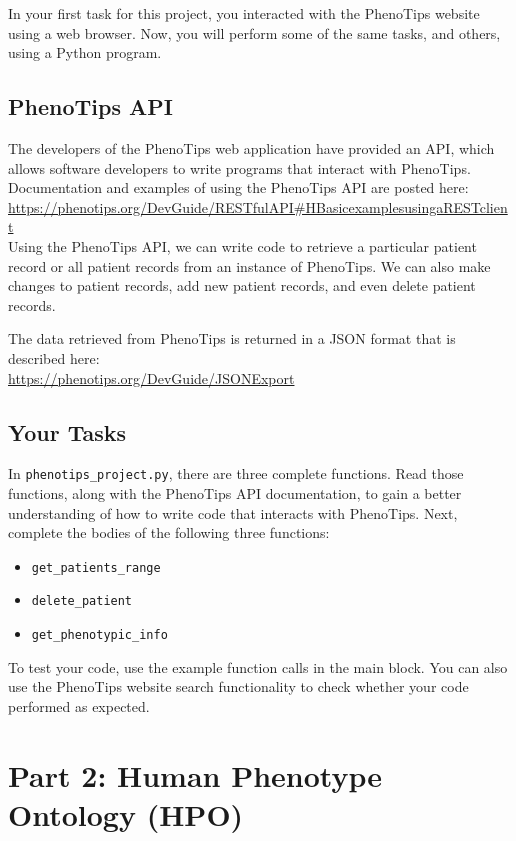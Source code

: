 \documentclass[a4paper]{article}
\begin{document}
In your first task for this project, you interacted with the PhenoTips website using a web browser.  Now, you will perform some of the same tasks, and others, using a Python program.

\subsection{PhenoTips API}

The developers of the PhenoTips web application have provided an API, which allows software developers to write programs that interact with PhenoTips.  Documentation and examples of using the PhenoTips API are posted here:\\

\url{https://phenotips.org/DevGuide/RESTfulAPI#HBasicexamplesusingaRESTclient}\\

Using the PhenoTips API, we can write code to retrieve a particular patient record or  all patient records from an instance of PhenoTips.  We can also make changes to patient records, add new patient records, and even delete patient records.

The data retrieved from PhenoTips is returned in a JSON format that is described here:\\

\url{https://phenotips.org/DevGuide/JSONExport}

\subsection{Your Tasks}
In \texttt{phenotips\_project.py}, there are three complete functions.  Read those functions, along with the PhenoTips API documentation, to gain a better understanding of how to write code that interacts with PhenoTips.  Next, complete the bodies of the following three functions:
\begin{itemize}
\item \texttt{get\_patients\_range}
\item \texttt{delete\_patient}
\item \texttt{get\_phenotypic\_info}
\end{itemize}

To test your code, use the example function calls in the main block.  You can also use the PhenoTips website search functionality to check whether your code performed as expected.

\section{Part 2: Human Phenotype Ontology (HPO)}
\end{document}
